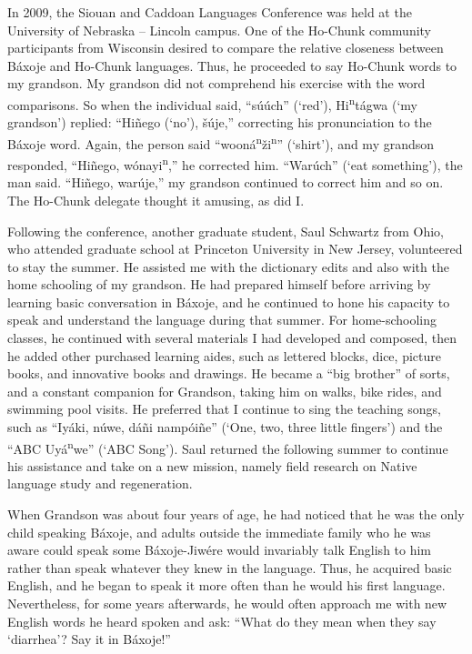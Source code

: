 \documentclass[output=paper]{LSP/langsci}
\begin{document}
In 2009, the Siouan and Caddoan Languages Conference was held at the University of Nebraska -- Lincoln campus. One of the Ho-Chunk community participants from Wisconsin desired to compare the relative closeness between Báxoje and Ho-Chunk languages. Thus, he proceeded to say Ho-Chunk words to my grandson. My grandson did not comprehend his exercise with the word comparisons. So when the individual said, ``s\'u\'uch'' (`red'), Hi\textsuperscript{n}tágwa (`my grandson') replied: ``Hiñego (`no'), \v{s}\'uje,'' correcting his pronunciation to the Báxoje word. Again, the person said ``wooná\textsuperscript{n}\v{z}i\textsuperscript{n}'' (`shirt'), and my grandson responded, ``Hiñego, wónayi\textsuperscript{n},'' he corrected him. ``War\'uch'' (`eat something'), the man said. ``Hiñego, war\'uje,'' my grandson continued to correct him and so on. The Ho-Chunk delegate thought it amusing, as did I.

Following the conference, another graduate student, Saul Schwartz from Ohio, who attended graduate school at Princeton University in New Jersey, volunteered to stay the summer. He assisted me with the dictionary edits and also with the home schooling of my grandson. He had prepared himself before arriving by learning basic conversation in Báxoje, and he continued to hone his capacity to speak and understand the language during that summer. For home-schooling classes, he continued with several materials I had developed and composed, then he added other purchased learning aides, such as lettered blocks, dice, picture books, and innovative books and drawings. He became a ``big brother'' of sorts, and a constant companion for Grandson, taking him on walks, bike rides, and swimming pool visits. He preferred that I continue to sing the teaching songs, such as ``Iyáki, n\'uwe, dáñi nampóiñe'' (`One, two, three little fingers') and the ``ABC Uyá\textsuperscript{n}we'' (`ABC Song'). Saul returned the following summer to continue his assistance and take on a new mission, namely field research on Native language study and regeneration.  

When Grandson was about four years of age, he had noticed that he was the only child speaking Báxoje, and adults outside the immediate family who he was aware could speak some Báxoje-Jiw\'ere would invariably talk English to him rather than speak whatever they knew in the language. Thus, he acquired basic English, and he began to speak it more often than he would his first language. Nevertheless, for some years afterwards, he would often approach me with new English words he heard spoken and ask: ``What do they mean when they say `diarrhea'? Say it in Báxoje!''
\end{document}
